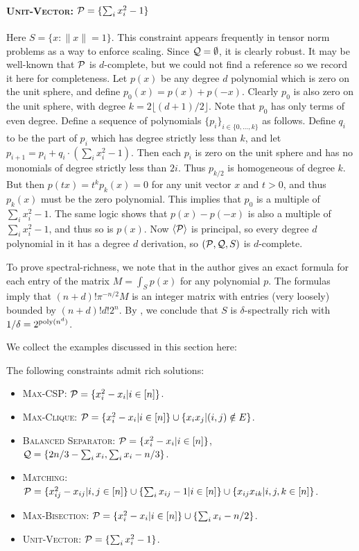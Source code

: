 \paragraph*{\textsc{Unit-Vector}: $\mathcal P = \{\sum_i x_i^2 - 1\}$} Here $S = \{x: \|x\| = 1\}$. This constraint appears frequently in tensor norm problems as a way to enforce scaling. Since $\mathcal Q = \emptyset$, it is clearly robust. It may be well-known that $\mathcal P$ is $d$-complete, but we could not find a reference so we record it here for completeness. Let $p(x)$ be any degree $d$ polynomial which is zero on the unit sphere, and define $p_0(x) = p(x) + p(-x)$. Clearly $p_0$ is also zero on the unit sphere, with degree $k = 2\lfloor (d+1)/2 \rfloor$. Note that $p_0$ has only terms of even degree. 
%
Define a sequence of polynomials $\{p_i\}_{i \in \{0,\ldots, k\}}$ as follows.
Define $q_i$ to be the part of $p_i$ which has degree strictly less than $k$, and let $p_{i+1} = p_i + q_i\cdot(\sum_i x_i^2 - 1)$. Then each $p_i$ is zero on the unit sphere and has no monomials of degree strictly less than $2i$. Thus $p_{k/2}$ is homogeneous of degree $k$. But then $p(tx) = t^kp_k(x) = 0$ for any unit vector $x$ and $t > 0$, and thus $p_k(x)$ must be the zero polynomial. This implies that $p_0$ is a multiple of $\sum_i x_i^2 - 1$. The same logic shows that $p(x) - p(-x)$ is also a multiple of $\sum_i x_i^2 - 1$, and thus so is $p(x)$. Now $\langle \mathcal P\rangle$ is principal, so every degree $d$ polynomial in it has a degree $d$ derivation, so $(\mathcal P, \mathcal Q, S)$ is $d$-complete.

To prove spectral-richness, we note that in \cite{10.2307/2695802} the author gives an exact formula for each entry of the matrix $M = \int_{S} p(x)$ for any polynomial $p$. The formulas imply that $(n+d)!\pi^{-n/2} M$ is an integer matrix with entries (very loosely) bounded by $(n+d)!d!2^n$. By , we conclude that $S$ is $\delta$-spectrally rich with $1/\delta = 2^{\operatorname{poly}(n^d)}$.


We collect the examples discussed in this section here:
\begin{corollary}\label{cor:examples}
The following constraints admit rich solutions:
\begin{itemize}
\item \textsc{Max-CSP}: $\mathcal P = \{x_i^2 - x_i | i \in [n]\}$. 
\item \textsc{Max-Clique}: $\mathcal P = \{x_i^2 - x_i | i \in [n]\} \cup \{x_ix_j | (i,j) \notin E\}$.
\item \textsc{Balanced Separator}: $\mathcal P = \{x_i^2 - x_i | i \in [n]\}$, $\mathcal Q = \{2n/3 - \sum_i x_i, \sum_i x_i - n/3\}$.
\item \textsc{Matching}: $\mathcal P = \{x_{ij}^2 - x_{ij} | i,j \in [n]\} \cup \{\sum_i x_{ij} - 1 | i \in [n]\} \cup \{x_{ij}x_{ik} | i,j,k \in [n]\}$.
\item \textsc{Max-Bisection}: $\mathcal P = \{x_i^2 - x_i | i \in [n]\} \cup \{\sum_i x_i - n/2\}$.
\item \textsc{Unit-Vector}: $\mathcal P = \{\sum_i x_i^2 - 1\}$.
\end{itemize}
\end{corollary}

